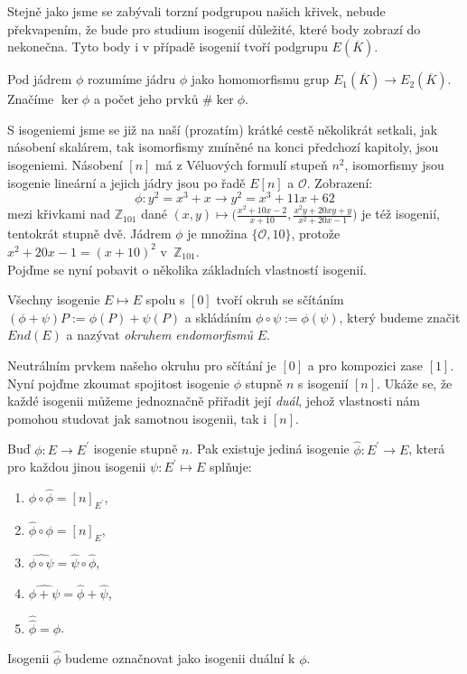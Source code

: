 \documentclass [12pt]{report}
\begin{document}
Stejně jako jsme se zabývali torzní podgrupou našich křivek, nebude překvapením, že bude pro studium isogenií důležité, které body zobrazí do nekonečna. Tyto body i v případě isogenií tvoří podgrupu $E(\overline{K})$.


\begin{definice}
Pod jádrem $\phi$ rozumíme jádru $\phi$ jako homomorfismu grup $E_1 (\overline{K}) \longrightarrow E_2 (\overline{K})$. Značíme $\ker \phi$ a počet jeho prvků $\# \ker \phi$. 
\end{definice}

S isogeniemi jsme se již na naší (prozatím) krátké cestě několikrát setkali, jak násobení skalárem, tak isomorfismy zmíněné na konci předchozí kapitoly, jsou isogeniemi. Násobení $[n]$ má z Véluových formulí stupeň $n^2$, isomorfismy jsou isogenie lineární a jejich jádry jsou po řadě $E[n]$ a $\mathcal{O}$. Zobrazení:
\begin{equation*}
\phi : y^2 = x^3+x \longrightarrow y^2 =  x^3 + 11x + 62
\end{equation*}
mezi křivkami nad $\mathbb{Z}_{101}$ dané $(x,y) \mapsto \Big(\frac{x^2 + 10x - 2}{x+10},\frac{x^2 y + 20xy + y}{x^2 + 20x - 1}\Big)$ je též isogenií, tentokrát stupně dvě. Jádrem $\phi$ je množina $\lbrace \mathcal{O},10 \rbrace$, protože $x^2 + 20x - 1 = (x+10)^2$ v~$\mathbb{Z}_{101}$.\\

Pojďme se nyní pobavit o několika základních vlastností isogenií.

\begin{veta}
Všechny isogenie $E \mapsto E$ spolu s $[0]$ tvoří okruh se sčítáním $(\phi + \psi)P := \phi (P) + \psi (P)$ a skládáním $\phi \circ \psi  := \phi(\psi)$, který budeme značit $End(E)$ a nazývat \textit{okruhem endomorfismů } $E$. 
\end{veta}
Neutrálním prvkem našeho okruhu pro sčítání je $[0]$ a pro kompozici zase $[1]$. Nyní pojďme zkoumat spojitost isogenie $\phi $ stupně $n$ s isogenií $[n]$. Ukáže se, že každé isogenii můžeme jednoznačně přiřadit její \textit{duál}, jehož vlastnosti nám pomohou studovat jak samotnou isogenii, tak i $[n]$.

\begin{veta}\label{dual}
Buď $\phi: E \longrightarrow E^\prime$ isogenie stupně $n$. Pak existuje jediná isogenie $\hat{\phi}: E^\prime \longrightarrow E$, která pro každou jinou isogenii $\psi: E^\prime \mapsto E$ splňuje:
\begin{enumerate}
\item $\phi \circ \hat{\phi} = [n]_{E^\prime}$,
\item $\hat{\phi} \circ \phi = [n]_E$,
\item $\widehat{\phi \circ \psi} = \hat{\psi} \circ \hat{\phi}$,
\item $\widehat{\phi + \psi} = \hat{\phi} + \hat{\psi}$,
\item $\hat{\hat{\phi} } = \phi $.
\end{enumerate} 
Isogenii $\hat{\phi}$ budeme označnovat jako isogenii duální k $\phi$.
\end{veta}
\end{document}
